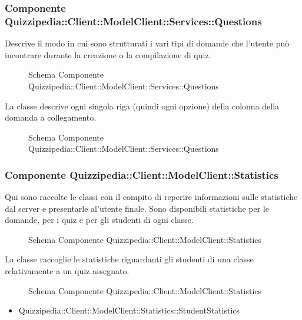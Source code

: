 \subsubsection{Componente Quizzipedia::Client::ModelClient::Services::Questions}
Descrive il modo in cui sono strutturati i vari tipi di domande che l'utente può incontrare durante la creazione o la compilazione di quiz.
\begin{figure}[H]
\centering
\noindent{}
\caption{Schema Componente Quizzipedia::Client::ModelClient::Services::Questions}
\end{figure}
La classe descrive ogni singola riga (quindi ogni opzione) della colonna della domanda a collegamento.
\begin{figure}[H]
\centering
\noindent{}
\caption{Schema Componente Quizzipedia::Client::ModelClient::Services::Questions}
\end{figure}
\subsubsection{Componente Quizzipedia::Client::ModelClient::Statistics}
Qui sono raccolte le classi con il compito di reperire informazioni sulle statistiche dal server e presentarle al'utente finale. Sono disponibili statistiche per le domande, per i quiz e per gli studenti di ogni classe.
\begin{figure}[H]
\centering
\noindent{}
\caption{Schema Componente Quizzipedia::Client::ModelClient::Statistics}
\end{figure}
La classe raccoglie le statistiche riguardanti gli studenti di una classe relativamente a un quiz assegnato.
\begin{figure}[H]
\centering
\noindent{}
\caption{Schema Componente Quizzipedia::Client::ModelClient::Statistics}
\end{figure}
\begin{itemize}
\item Quizzipedia::Client::ModelClient::Statistics::StudentStatistics
\end{itemize}
